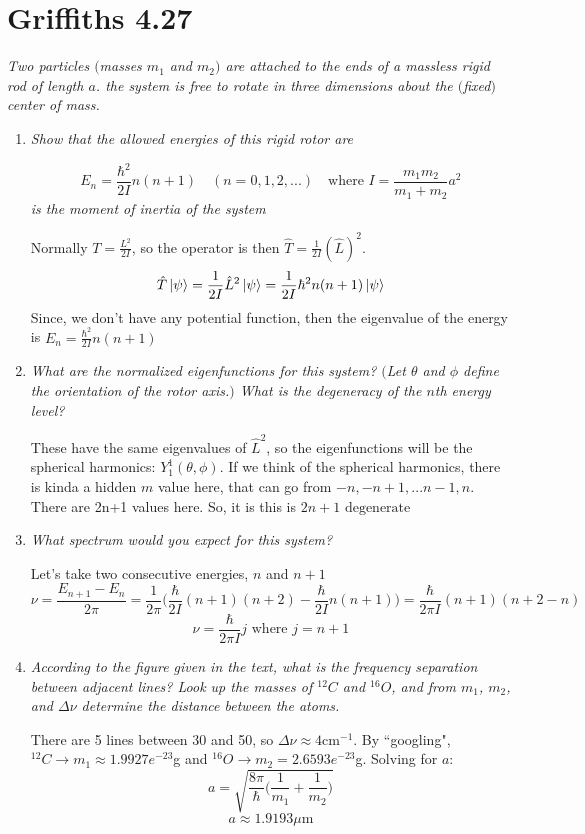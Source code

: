 \documentclass[12pt]{article}
\begin{document}
\section*{Griffiths 4.27}
{\sl Two particles $($masses $m_1$ and $m_2)$ are attached to the ends of a massless rigid rod of length $a$. the system is free to rotate in three dimensions about the $($fixed$)$ center of mass.}
\begin{enumerate}[label=\alph*)]
\item {\sl Show that the allowed energies of this rigid rotor are}

\[E_n = \frac{\hbar^2}{2I}n(n+1) \quad (n = 0,1,2,...) \quad \text{where } I = \frac{m_1 m_2}{m_1 + m_2}a^2\]
{\sl is the moment of inertia of the system}

Normally $T = \frac{L^2}{2I}$, so the operator is then $\hat{T} = \frac{1}{2I}(\hat{L})^2$. 
\[\hat{T}\ket{\psi} = \frac{1}{2I}\hat{L}^2 \ket{\psi} = \frac{1}{2I}\hbar^2 n(n+1) \ket{\psi}\]
Since, we don't have any potential function, then the eigenvalue of the energy is $\boxed{E_n = \frac{\hbar^2}{2I}n(n+1)}$

\item {\sl What are the normalized eigenfunctions for this system? $($Let $\theta$ and $\phi$ define the orientation of the rotor axis.$)$ What is the degeneracy of the $n$th energy level?}

These have the same eigenvalues of $\hat{L}^2$, so the eigenfunctions will be the spherical harmonics: $\boxed{Y_1^1(\theta, \phi)}$. If we think of the spherical harmonics, there is kinda a hidden $m$ value here, that can go from $-n, -n+1, ... n-1, n$. There are 2n+1 values here. So, it is this is $\boxed{2n+1 \text{ degenerate}}$

\item {\sl What spectrum would you expect for this system?}

Let's take two consecutive energies, $n$ and $n+1$
\[\nu = \frac{E_{n+1}-E_n}{2\pi} = \frac{1}{2 \pi}\Big(\frac{\hbar}{2I}(n+1)(n+2) - \frac{\hbar}{2I}n(n+1)\Big) = \frac{\hbar}{2 \pi I}(n+1)(n+2-n)\]
\[\boxed{\nu = \frac{\hbar}{2 \pi I}j \text{ where } j = n+1}\]

\item {\sl According to the figure given in the text, what is the frequency separation between adjacent lines? Look up the masses of $^{12}C$ and $^{16}O$, and from $m_1$, $m_2$, and $\Delta \nu$ determine the distance between the atoms.}

There are 5 lines between 30 and 50, so $\Delta\nu \approx 4 \text{cm}^{-1}$. By ``googling", 
$^{12}C \rightarrow m_1 \approx 1.9927e^{-23}$g and $^{16}O \rightarrow m_2 = 2.6593e^{-23}$g.
Solving for $a$:
\[a = \sqrt{\frac{8\pi}{\hbar}\Big(\frac{1}{m_1} + \frac{1}{m_2}\Big)}\]
\[\boxed{a \approx 1.9193 \mu \text{m}}\]

\end{enumerate}
\end{document}
